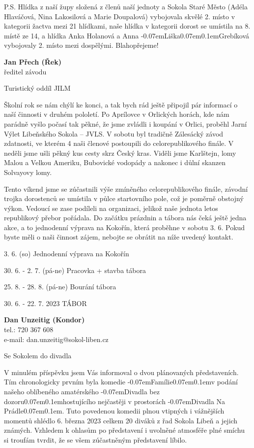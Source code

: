 \documentclass[11pt]{article}
\newcommand{\post}[1]{%
\begin{center}
{\huge \tyrs #1}
\end{center}
}
\newcommand{\signature}[2]{%
  \begin{flushright}
    \textbf{#1}\\#2
  \end{flushright}
}
\newcommand{\luv}{\clqq\kern-0.07em}
\newcommand{\ruv}{\kern0.07em\crqq\kern0.1em}
\begin{document}
P.S. Hlídka z naší župy složená z členů naší jednoty a Sokola Staré Město (Adéla Hlaváčová, Nina Lakosilová a Marie Doupalová) vybojovala skvělé 2. místo v kategorii žactva mezi 21 hlídkami, naše hlídka v kategorii dorost se umístila na 8. místě ze 14, a hlídka Anka Holanová a Anna \luv Liška\ruv Grebíková vybojovaly 2. místo mezi dospělými. Blahopřejeme! 

\signature{Jan Přech (Řek)}{ředitel závodu}

\clearpage

\post{Turistický oddíl JILM}
Školní rok se nám chýlí ke konci, a tak bych rád ještě připojil pár informací o naší činnosti v druhém pololetí. Po Aprílovce v Orlických horách, kde nám parádně vyšlo počasí tak pěkné, že jsme zvládli i koupání v Orlici, proběhl Jarní Výlet Libeňského Sokola – JVLS. V sobotu byl tradičně Zálesácký závod zdatnosti, ve kterém 4 naši členové postoupili do celorepublikového finále. V neděli jsme ušli pěkný kus cesty skrz Český kras. Viděli jsme Karlštejn, lomy Malou a Velkou Ameriku, Bubovické vodopády a nakonec i důlní skanzen Solvayovy lomy. 

Tento víkend jsme se zúčastnili výše zmíněného celorepublikového finále, závodní trojka dorostenců se umístila v půlce startovního pole, což je poměrně obstojný výkon. Vedoucí se zase podíleli na organizaci, jelikož naše jednota letos republikový přebor pořádala. Do začátku prázdnin a tábora nás čeká ještě jedna akce, a to jednodenní výprava na Kokořín, která proběhne v sobotu 3. 6. Pokud byste měli o naši činnost zájem, nebojte se obrátit na níže uvedený kontakt.

\vspace*{12pt}

3. 6. (so) Jednodenní výprava na Kokořín

30. 6. - 2. 7. (pá-ne) Pracovka + stavba tábora

25. 8. - 28. 8. (pá-ne) Bourání tábora

30. 6. - 22. 7. 2023  TÁBOR
 
\signature{Dan Unzeitig (Kondor)}{tel.: 720 367 608\\e-mail: dan.unzeitig@sokol-liben.cz}

\vspace{24pt}

\post{Se Sokolem do divadla}
V minulém příspěvku jsem Vás informoval o dvou plánovaných představeních. Tím chronologicky prvním byla komedie \luv Famílie\ruv v podání našeho oblíbeného amatérského \luv Divadla bez dozoru\ruv hostujícího nejčastěji v prostorách \luv Divadla Na Prádle\ruv. Tuto povedenou komedii plnou vtipných i vážnějších momentů shlédlo 6. března 2023 celkem 20 diváků z řad Sokola Libeň a jejich známých. Vzhledem k ohlasům po představení i uvolněné atmosféře plné smíchu si troufám tvrdit, že se všem zúčastněným představení líbilo.
\end{document}
